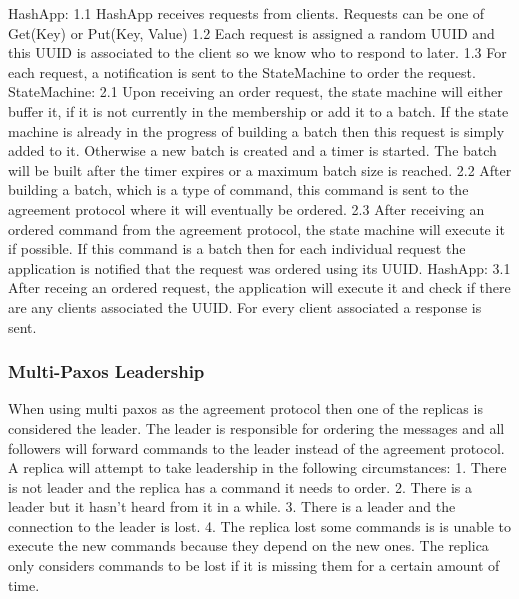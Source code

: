 \documentclass[sigconf]{acmart}
\begin{document}

HashApp:
1.1 HashApp receives requests from clients.
    Requests can be one of Get(Key) or Put(Key, Value)
1.2 Each request is assigned a random UUID and this UUID is associated to the client so we know who to respond to later.
1.3 For each request, a notification is sent to the StateMachine to order the request.
StateMachine:
2.1 Upon receiving an order request, the state machine will either buffer it, if it is not currently in the membership or add it to a batch.
    If the state machine is already in the progress of building a batch then this request is simply added to it.
    Otherwise a new batch is created and a timer is started. The batch will be built after the timer expires or a maximum batch size is reached.
2.2 After building a batch, which is a type of command, this command is sent to the agreement protocol where it will eventually be ordered.
2.3 After receiving an ordered command from the agreement protocol, the state machine will execute it if possible.
    If this command is a batch then for each individual request the application is notified that the request was ordered using its UUID.
HashApp:
3.1 After receing an ordered request, the application will execute it and check if there are any clients associated the UUID.
    For every client associated a response is sent.

\subsubsection{Multi-Paxos Leadership} %


When using multi paxos as the agreement protocol then one of the replicas is considered the leader.
The leader is responsible for ordering the messages and all followers will forward commands to the leader
instead of the agreement protocol.
A replica will attempt to take leadership in the following circumstances:
1. There is not leader and the replica has a command it needs to order.
2. There is a leader but it hasn't heard from it in a while.
3. There is a leader and the connection to the leader is lost.
4. The replica lost some commands is is unable to execute the new commands
    because they depend on the new ones. The replica only considers commands
    to be lost if it is missing them for a certain amount of time.
\end{document}
